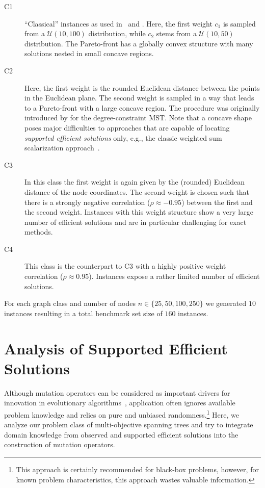 \documentclass[twoside]{article}
\begin{document}
\begin{description}
\item[C1] \enquote{Classical} instances as used in~\citet{ZG99} and \citet{KC01}. Here, the first weight $c_1$ is sampled from a $\mathcal{U}(10, 100)$ distribution, while $c_2$ stems from a $\mathcal{U}(10, 50)$ distribution. The Pareto-front has a globally convex structure with many solutions nested in small concave regions. 
\item[C2] Here, the first weight is the rounded Euclidean distance between the points in the Euclidean plane. The second weight is sampled in a way that leads to a Pareto-front with a large concave region. The procedure was originally introduced by \citet{KC2001Generators} for the degree-constraint MST. Note that a concave shape poses major difficulties to approaches that are capable of locating \emph{supported efficient solutions} only, e.g., the classic weighted sum scalarization approach~\citep[Chapter~3, pp.~65]{Ehrgott2005}.
\item[C3] In this class the first weight is again given by the (rounded) Euclidean distance of the node coordinates. The second weight is chosen such that there is a strongly negative correlation ($\rho \approx -0.95$) between the first and the second weight. Instances with this weight structure show a very large number of efficient solutions and are in particular challenging for exact methods.
\item[C4] This class is the counterpart to C3 with a highly positive weight correlation ($\rho \approx 0.95$). Instances expose a rather limited number of efficient solutions.
\end{description}
For each graph class and number of nodes $n \in \{25, 50, 100, 250\}$ we generated $10$ instances resulting in a total benchmark set size of $160$ instances.



\section{Analysis of Supported Efficient Solutions}
\label{sec:analysis}

Although mutation operators can be considered as important drivers for innovation in evolutionary algorithms~\citep{Bey01}, application often ignores available problem knowledge and relies on pure and unbiased randomness.\footnote{This approach is certainly recommended for black-box problems, however, for known problem characteristics, this approach wastes valuable information.} Here, we analyze our problem class of multi-objective spanning trees and try to integrate domain knowledge from observed and supported efficient solutions into the construction of mutation operators. 
\end{document}
